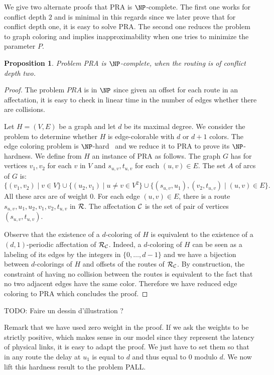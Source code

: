 \documentclass[a4paper,10pt]{article}
\newtheorem{proposition}{Proposition}
\newcommand{\todo}[1]{{\color{red} TODO: {#1}}}
\begin{document}
We give two alternate proofs that PRA is $\NP$-complete.
The first one works for conflict depth $2$ and is minimal in this regards since we later prove that for conflict depth one,
it is easy to solve PRA. The second one reduces the problem to graph coloring and implies inapproximability when one tries to minimize the parameter $P$. \\

 \begin{proposition}
Problem PRA is $\NP$-complete, when the routing is of conflict depth two.
\end{proposition}
 \begin{proof}
 The problem $PRA$ is in $\NP$ since given an offset for each route in an affectation, it is easy to check in linear time in the number of edges whether there are collisions.
 
  Let $H=(V,E)$ be a graph and let $d$ be its maximal degree. We consider the problem to determine whether $H$ is edge-colorable
  with $d$ or $d+1$ colors. The edge coloring problem is $\NP$-hard~\cite{holyer1981np} and we reduce it to PRA to prove its $\NP$-hardness. We define from $H$ an instance of PRA as follows. The graph $G$ has for vertices $v_1, v_2$ for each $v$ in $V$
  and $s_{u,v}, t_{u,v}$ for each $(u,v) \in E$. The set $A$ of arcs of $G$ is: 
  $$ \{(v_1,v_2) \mid v\in V\} \cup \{(u_2,v_1)\mid u \neq v \in V^2\} \cup \{(s_{u,v},u_1),(v_2,t_{u,v}) \mid (u,v) \in E \}. $$
  All these arcs are of weight $0$. 
  For each edge $(u,v) \in E$, there is a route $s_{u,v},u_1,u_2,v_1,v_2,t_{u,v}$ in ${\cal R}$.  
  The affectation ${\cal C}$ is the set of pair of vertices $(s_{u,v}, t_{u,v})$.
    
  Observe that the existence of a $d$-coloring of $H$ is equivalent to the existence of a $(d,1)$-periodic affectation
  of ${\cal R}_{\cal C}$. Indeed, a $d$-coloring of $H$ can be seen as a labeling of its edges by the integers
  in $\{0,\dots,d-1\}$ and we have a bijection between $d$-colorings of $H$ and offsets of the routes of ${\cal R}_{\cal C}$.
  By construction, the constraint of having no collision between the routes is equivalent to the fact that no two adjacent edges have
  the same color. Therefore we have reduced edge coloring to PRA which concludes the proof. 
 \end{proof}
 \todo{Faire un dessin d'illustration ?}
 
 Remark that we have used zero weight in the proof. If we ask the weights to be strictly positive, which makes sense in our model since
they represent the latency of physical links, it is easy to adapt the proof. We just have to set them so that in any route the delay at $u_1$ is equal to $d$ and thus equal to $0$ modulo $d$. We now lift this hardness result to the problem PALL.
\end{document}
